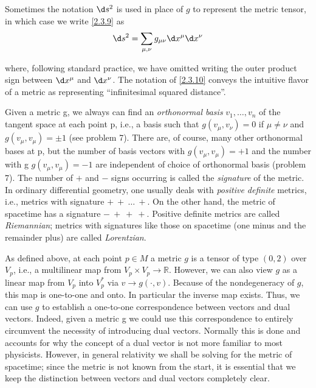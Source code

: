 Sometimes the notation $\d s^2$ is used in place of $g$ to represent the metric tensor, in which case we write \eqref{2.3.9} as
\begin{equation}
    \d s^2=\sum_{\mu,\nu}g_{\mu\nu}\d x^\mu\d x^\nu
    \label{2.3.10}
\end{equation}

where, following standard practice, we have omitted writing the outer product sign between $\d x^\mu$ and $\d x^\nu$. The notation of \eqref{2.3.10} conveys the intuitive flavor of a metric as representing ``infinitesimal squared distance''.

Given a metric g, we always can find an \emph{orthonormal basis} $v_1,\ldots,v_n$ of the tangent space at each point p, i.e., a basis such that $g(v_\mu,v_\nu)=0$ if $\mu\neq\nu$ and $g(v_\mu,v_\mu)=\pm 1$ (see problem 7). There are, of course, many other orthonormal bases at p, but the number of basis vectors with $g(v_\mu,v_\mu)=+1$ and the number with g $g(v_\mu,v_\mu)=-1$ are independent of choice of orthonormal basis (problem 7). The number of $+$ and $-$ signs occurring is called the \emph{signature} of the metric. In ordinary differential geometry, one usually deals with \emph{positive definite} metrics, i.e., metrics with signature $+\ +\ \ldots\ +$. On the other hand, the metric of spacetime has a signature $-\ +\ +\ +$. Positive definite metrics are called \emph{Riemannian}; metrics with signatures like those on spacetime (one minus and the remainder plus) are called \emph{Lorentzian}.

As defined above, at each point $p\in M$ a metric $g$ is a tensor of type $(0,2)$ over $V_p$, i.e., a multilinear map from $V_p\times V_p\to\mathbb{R}$. However, we can also view $g$ as a linear map from $V_p$ into $V_p^*$ via $v\to g(\cdot,v)$. Because of the nondegeneracy of $g$, this map is one-to-one and onto. In particular the inverse map exists. Thus, we can use $g$ to establish a one-to-one correspondence between vectors and dual vectors. Indeed, given a metric g we could use this correspondence to entirely circumvent the necessity of introducing dual vectors. Normally this is done and accounts for why the concept of a dual vector is not more familiar to most physicists. However, in general relativity we shall be solving for the metric of spacetime; since the metric is not known from the start, it is essential that we keep the distinction between vectors and dual vectors completely clear.

